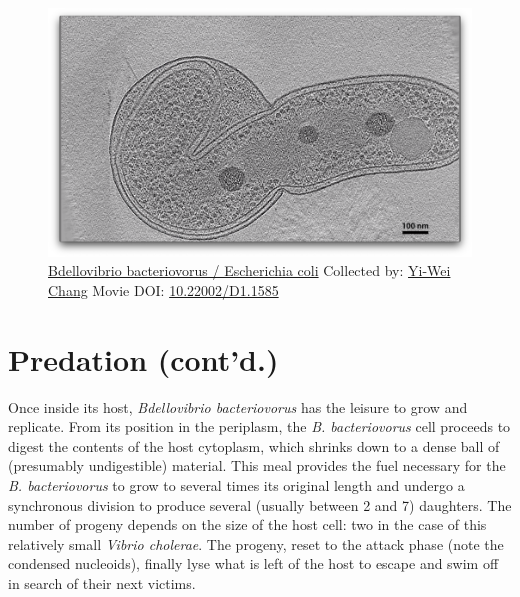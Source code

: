 \documentclass[]{tufte-book}
\begin{document}
\begin{figure}
\includegraphics{movie_stills/9_10a} \caption[\protect\hyperlink{tree}{Bdellovibrio bacteriovorus /
Escherichia coli} Collected by: \protect\hyperlink{yi-wei_chang}{Yi-Wei
Chang} Movie DOI:
\href{https://doi.org/10.22002/D1.1585}{10.22002/D1.1585}]{\protect\hyperlink{tree}{Bdellovibrio bacteriovorus /
Escherichia coli} Collected by: \protect\hyperlink{yi-wei_chang}{Yi-Wei
Chang} Movie DOI:
\href{https://doi.org/10.22002/D1.1585}{10.22002/D1.1585}}\label{fig:9-10a}
\end{figure}

\section{Predation (cont'd.)}\label{predation-contd.-1}

Once inside its host, \emph{Bdellovibrio bacteriovorus} has the leisure
to grow and replicate. From its position in the periplasm, the \emph{B.
bacteriovorus} cell proceeds to digest the contents of the host
cytoplasm, which shrinks down to a dense ball of (presumably
undigestible) material. This meal provides the fuel necessary for the
\emph{B. bacteriovorus} to grow to several times its original length and
undergo a synchronous division to produce several (usually between 2 and
7) daughters. The number of progeny depends on the size of the host
cell: two in the case of this relatively small \emph{Vibrio cholerae}.
The progeny, reset to the attack phase (note the condensed nucleoids),
finally lyse what is left of the host to escape and swim off in search
of their next victims.
\end{document}

